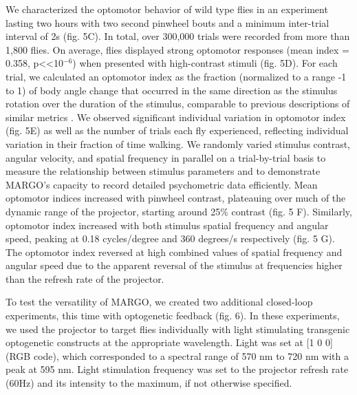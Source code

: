 \documentclass[10pt]{article}
\begin{document}
\begin{multicols}{2}
We characterized the optomotor behavior of wild type flies in an experiment lasting two hours with two second pinwheel bouts and a minimum inter-trial interval of 2s (fig. 5C). In total, over 300,000 trials were recorded from more than 1,800 flies. On average, flies displayed strong optomotor responses (mean index = 0.358, p<<10$^{-6}$) when presented with high-contrast stimuli (fig. 5D). For each trial, we calculated an optomotor index as the fraction (normalized to a range -1 to 1) of body angle change that occurred in the same direction as the stimulus rotation over the duration of the stimulus, comparable to previous descriptions of similar metrics \cite{Seelig_Two_2010}. We observed significant individual variation in optomotor index (fig. 5E) as well as the number of trials each fly experienced, reflecting individual variation in their fraction of time walking. We randomly varied stimulus contrast, angular velocity, and spatial frequency in parallel on a trial-by-trial basis to measure the relationship between stimulus parameters and to demonstrate MARGO's capacity to record detailed psychometric data efficiently. Mean optomotor indices increased with pinwheel contrast, plateauing over much of the dynamic range of the projector, starting around 25\% contrast (fig. 5 F). Similarly, optomotor index increased with both stimulus spatial frequency and angular speed, peaking at 0.18 cycles/degree and 360 degrees/s respectively (fig. 5 G). The optomotor index reversed at high combined values of spatial frequency and angular speed due to the apparent reversal of the stimulus at frequencies higher than the refresh rate of the projector.

To test the versatility of MARGO, we created two additional closed-loop experiments, this time with optogenetic feedback (fig. 6). In these  experiments, we used the projector to target flies individually with light stimulating transgenic optogenetic constructs at the appropriate wavelength. Light was set at [1 0 0] (RGB code), which corresponded to a spectral range of 570 nm to 720 nm with a peak at 595 nm. Light stimulation frequency was set to the projector refresh rate (60Hz) and its intensity to the maximum, if not otherwise specified.


\end{multicols}
\end{document}
